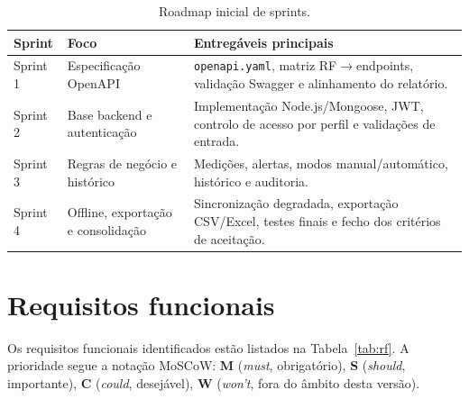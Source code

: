 \begin{table}[H]
\centering
\caption{Roadmap inicial de sprints.}
\label{tab:roadmap}
\renewcommand{\arraystretch}{1.3}
\begin{tabularx}{\linewidth}{l l X}
\toprule
\textbf{Sprint} & \textbf{Foco} & \textbf{Entregáveis principais} \\
\midrule
Sprint 1 & Especificação OpenAPI & \texttt{openapi.yaml}, matriz RF$\rightarrow$endpoints, validação Swagger e alinhamento do relatório. \\
Sprint 2 & Base backend e autenticação & Implementação Node.js/Mongoose, JWT, controlo de acesso por perfil e validações de entrada. \\
Sprint 3 & Regras de negócio e histórico & Medições, alertas, modos manual/automático, histórico e auditoria. \\
Sprint 4 & Offline, exportação e consolidação & Sincronização degradada, exportação CSV/Excel, testes finais e fecho dos critérios de aceitação. \\
\bottomrule
\end{tabularx}
\end{table}


\section{Requisitos funcionais}
\label{sec:rf}


Os requisitos funcionais identificados estão listados na
Tabela~\ref{tab:rf}. A prioridade segue a notação MoSCoW: \textbf{M}
(\emph{must}, obrigatório), \textbf{S} (\emph{should}, importante),
\textbf{C} (\emph{could}, desejável), \textbf{W} (\emph{won't},
fora do âmbito desta versão).

